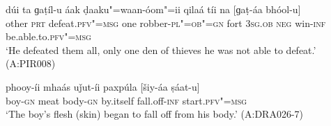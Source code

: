 \begin{exe}
\ex
\label{ex:9-77}
\gll dúi ta ɡaṭíl-u áak ḍaaku"=waan-óom"=ii qilaá tíi na [ɡaṭ-áa bhóol-u]  \\
other \textsc{prt} defeat.\textsc{pfv"=msg} one robber-\textsc{pl"=ob"=gn}  fort \textsc{3sg.ob} \textsc{neg} win-\textsc{inf} be.able.to.\textsc{pfv"=msg} \\
\glt `He defeated them all, only one den of thieves he was not able to defeat.' (A:PIR008)

\ex
\label{ex:9-78}
\gll phooy-íi mhaás uǰut-íi paxpúla [šiy-áa ṣáat-u] \\
boy-\textsc{gn} meat body-\textsc{gn} by.itself fall.off-\textsc{inf} start.\textsc{pfv"=msg} \\
\glt `The boy's flesh (skin) began to fall off from his body.' (A:DRA026-7) 
\end{exe}
